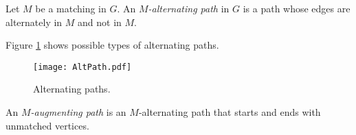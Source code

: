 \begin{page}
\setcounter{section}{4}
\setcounter{subsection}{2}
\setcounter{dfn}{3}
\label{portion:378}

\begin{dfn}
Let $M$ be a matching in $G$.
An \emph{$M$-alternating path} in $G$ is a path whose edges are alternately in $M$ and not in $M$.
\end{dfn}

\end{page}

\begin{page}
\setcounter{section}{4}
\setcounter{subsection}{2}
\setcounter{dfn}{3}
\label{portion:379}


Figure \ref{fig:AltPath} shows possible types of alternating paths.

\begin{figure}[ht]
\begin{center}
\texttt{[image: AltPath.pdf]}
\end{center}
\caption{Alternating paths.}
\label{fig:AltPath}
\end{figure}


\end{page}

\begin{page}
\setcounter{section}{4}
\setcounter{subsection}{2}
\setcounter{dfn}{4}
\label{portion:381}

\begin{dfn}
An \emph{$M$-augmenting path} is an $M$-alternating path that starts and ends with unmatched vertices.
\end{dfn}

\end{page}

